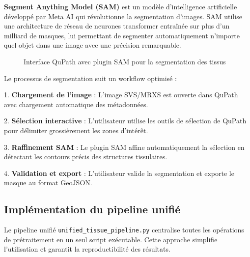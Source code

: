 \documentclass[12pt,a4paper]{report}
\begin{document}
\textbf{Segment Anything Model (SAM)} est un modèle d'intelligence artificielle développé par Meta AI qui révolutionne la segmentation d'images. SAM utilise une architecture de réseau de neurones transformer entraînée sur plus d'un milliard de masques, lui permettant de segmenter automatiquement n'importe quel objet dans une image avec une précision remarquable.


\begin{figure}[H]
\centering
{}
\caption{Interface QuPath avec plugin SAM pour la segmentation des tissus}
\label{fig:qupath_sam}
\end{figure}

Le processus de segmentation suit un workflow optimisé :

1. \textbf{Chargement de l'image} : L'image SVS/MRXS est ouverte dans QuPath avec chargement automatique des métadonnées.

2. \textbf{Sélection interactive} : L'utilisateur utilise les outils de sélection de QuPath pour délimiter grossièrement les zones d'intérêt.

3. \textbf{Raffinement SAM} : Le plugin SAM affine automatiquement la sélection en détectant les contours précis des structures tissulaires.

4. \textbf{Validation et export} : L'utilisateur valide la segmentation et exporte le masque au format GeoJSON.

\subsection{Implémentation du pipeline unifié}

Le pipeline unifié \texttt{unified\_tissue\_pipeline.py} centralise toutes les opérations de prétraitement en un seul script exécutable. Cette approche simplifie l'utilisation et garantit la reproductibilité des résultats.
\end{document}
